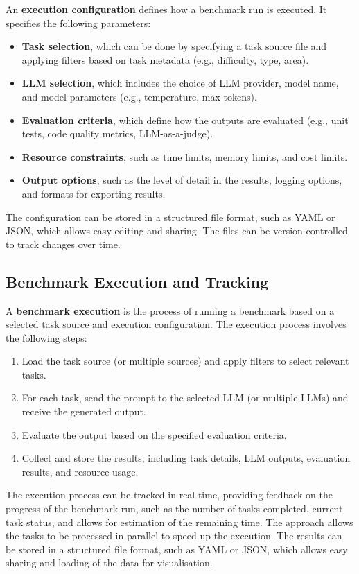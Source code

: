 An \textbf{execution configuration} defines how a benchmark run is executed.
It specifies the following parameters:
\begin{itemize}
    \item \textbf{Task selection}, which can be done by specifying a task source file and applying filters based on task metadata (e.g., difficulty, type, area).
    \item \textbf{LLM selection}, which includes the choice of LLM provider, model name, and model parameters (e.g., temperature, max tokens).
    \item \textbf{Evaluation criteria}, which define how the outputs are evaluated (e.g., unit tests, code quality metrics, LLM-as-a-judge).
    \item \textbf{Resource constraints}, such as time limits, memory limits, and cost limits.
    \item \textbf{Output options}, such as the level of detail in the results, logging options, and formats for exporting results.
\end{itemize}

The configuration can be stored in a structured file format, such as YAML or JSON, which allows easy editing and sharing.
The files can be version-controlled to track changes over time.

\subsection{Benchmark Execution and Tracking}
A \textbf{benchmark execution} is the process of running a benchmark based on a selected task source and execution configuration.
The execution process involves the following steps:
\begin{enumerate}
    \item Load the task source (or multiple sources) and apply filters to select relevant tasks.
    \item For each task, send the prompt to the selected LLM (or multiple LLMs) and receive the generated output.
    \item Evaluate the output based on the specified evaluation criteria.
    \item Collect and store the results, including task details, LLM outputs, evaluation results, and resource usage.
\end{enumerate}

The execution process can be tracked in real-time, providing feedback on the progress of the benchmark run, such as the number of tasks completed, current task status, and allows for estimation of the remaining time.
The approach allows the tasks to be processed in parallel to speed up the execution.
The results can be stored in a structured file format, such as YAML or JSON, which allows easy sharing and loading of the data for visualisation.


